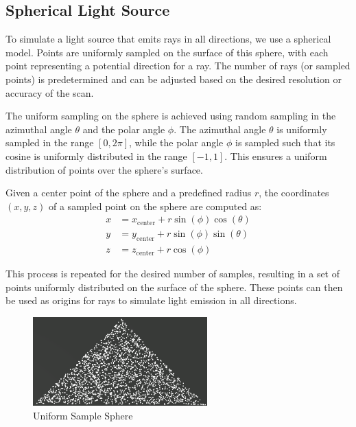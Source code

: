 \documentclass[11pt, a4paper,oneside,chapterprefix=false]{scrbook}
\begin{document}
\subsection{Spherical Light Source}

To simulate a light source that emits rays in all directions, we use a spherical model. Points are uniformly sampled on the surface of this sphere, with each point representing a potential direction for a ray. The number of rays (or sampled points) is predetermined and can be adjusted based on the desired resolution or accuracy of the scan.

\vspace{10pt}

The uniform sampling on the sphere is achieved using random sampling in the azimuthal angle \( \theta \) and the polar angle \( \phi \). The azimuthal angle \( \theta \) is uniformly sampled in the range \([0, 2\pi]\), while the polar angle \( \phi \) is sampled such that its cosine is uniformly distributed in the range \([-1, 1]\). This ensures a uniform distribution of points over the sphere's surface.

\vspace{10pt}

Given a center point of the sphere and a predefined radius \( r \), the coordinates \( (x, y, z) \) of a sampled point on the sphere are computed as:
\begin{align*}
x &= x_{\text{center}} + r \sin(\phi) \cos(\theta) \\
y &= y_{\text{center}} + r \sin(\phi) \sin(\theta) \\
z &= z_{\text{center}} + r \cos(\phi)
\end{align*}

This process is repeated for the desired number of samples, resulting in a set of points uniformly distributed on the surface of the sphere. These points can then be used as origins for rays to simulate light emission in all directions.

\begin{minipage}{\textwidth}
	\begin{figure}[H]
		\centering
		\includegraphics*[width=0.6\textwidth]{figures/uniform sample triangle.png}
		\caption{Uniform Sample Sphere}
		\label{fig:uniform sample sphere}
	\end{figure}
\end{minipage}
\end{document}
